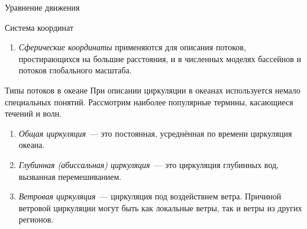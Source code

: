 \begin{chapter}{Уравнение движения}
\begin{section}{Система координат}
\begin{enumerate}
\emph{$\beta$-плоскость}~--- прямоугольная система координат, в которой сила
Кориолиса полагается линейно зависимой от широты. Она используется
для описания потоков в масштабах океанических бассейнов.
%

\item
\emph{Сферические координаты} применяются для описания потоков, простирающихся 
на большие расстояния, и в численных моделях бассейнов и потоков глобального 
масштаба.
%
\end{enumerate}
\end{section}

\begin{section}{Типы потоков в океане}
При описании циркуляции в океанах используется немало специальных понятий.
Рассмотрим наиболее популярные термины, касающиеся течений и волн.
%

\begin{enumerate}
\item
\emph{Общая циркуляция}~--- это постоянная, усреднённая по времени
циркуляция океана.
%

\item
\emph{Глубинная (абиссальная) циркуляция}~--- это циркуляция глубинных вод,
вызванная перемешиванием.
%

\item
\emph{Ветровая циркуляция}~--- циркуляция 
под воздействием ветра. Причиной ветровой циркуляции могут быть 
как локальные ветры, так и ветры из других регионов.
%


\end{enumerate}
\end{section}
\end{chapter}
